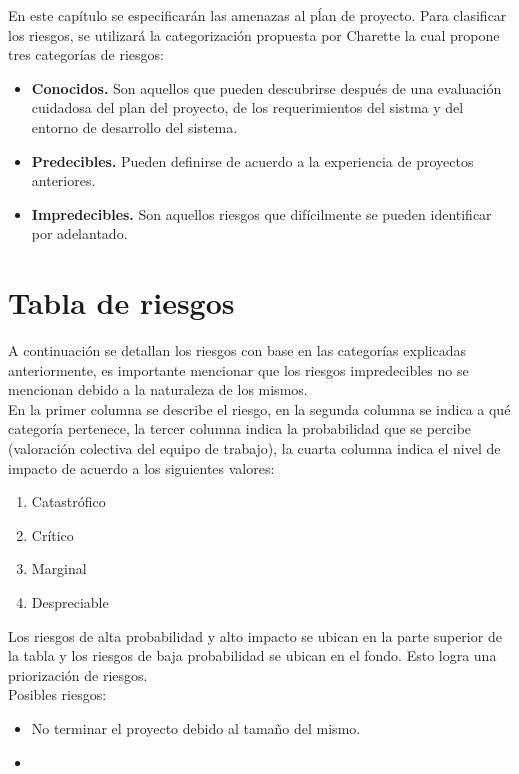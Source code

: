 En este capítulo se especificarán las amenazas al pĺan de proyecto. Para clasificar los riesgos, se utilizará la categorización propuesta por
Charette la cual propone tres categorías de riesgos:
\begin{itemize}
 \item {\bf Conocidos.} Son aquellos que pueden descubrirse después de una evaluación cuidadosa del plan del proyecto, de los requerimientos del sistma y del 
	entorno de desarrollo del sistema.
 \item {\bf Predecibles.} Pueden definirse de acuerdo a la experiencia de proyectos anteriores.
 \item {\bf Impredecibles.} Son aquellos riesgos que difícilmente se pueden identificar por adelantado.
\end{itemize}

\section{Tabla de riesgos}
A continuación se detallan los riesgos con base en las categorías explicadas anteriormente, es importante mencionar que los riesgos impredecibles no
se mencionan debido a la naturaleza de los mismos.\\

En la primer columna se describe el riesgo, en la segunda columna se indica a qué categoría pertenece, la tercer columna indica la 
probabilidad que se percibe (valoración colectiva del equipo de trabajo), la cuarta columna indica el nivel de impacto de acuerdo a los siguientes valores:

\begin{enumerate}
 \item Catastrófico
 \item Crítico
 \item Marginal 
 \item Despreciable
\end{enumerate}

Los riesgos de alta probabilidad y alto impacto se ubican en
la parte superior de la tabla y los riesgos de baja probabilidad se ubican en el fondo. Esto logra
una priorización de riesgos.\\

Posibles riesgos:
\begin{itemize}
 \item No terminar el proyecto debido al tamaño del mismo.
 \item 
\end{itemize}




